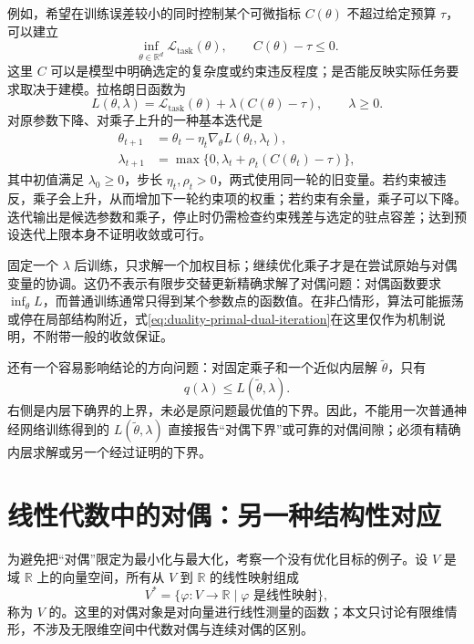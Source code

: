 \documentclass[UTF8]{ctexart}
\begin{document}
例如，希望在训练误差较小的同时控制某个可微指标 $C(\theta)$ 不超过给定预算 $\tau$，可以建立
\[
 \inf_{\theta\in\mathbb R^d}\mathcal L_{\mathrm{task}}(\theta),
 \qquad C(\theta)-\tau\leq0.
\]
这里 $C$ 可以是模型中明确选定的复杂度或约束违反程度；是否能反映实际任务要求取决于建模。拉格朗日函数为
\[
 L(\theta,\lambda)
 =\mathcal L_{\mathrm{task}}(\theta)+\lambda(C(\theta)-\tau),
 \qquad\lambda\geq0.
\]
对原参数下降、对乘子上升的一种基本迭代是
\begin{equation}
 \begin{aligned}
 \theta_{t+1}
 &=\theta_t-\eta_t\nabla_\theta L(\theta_t,\lambda_t),\\
 \lambda_{t+1}
 &=\max\{0,\lambda_t+\rho_t(C(\theta_t)-\tau)\},
 \end{aligned}
 \label{eq:duality-primal-dual-iteration}
\end{equation}
其中初值满足 $\lambda_0\geq0$，步长 $\eta_t,\rho_t>0$，两式使用同一轮的旧变量。若约束被违反，乘子会上升，从而增加下一轮约束项的权重；若约束有余量，乘子可以下降。迭代输出是候选参数和乘子，停止时仍需检查约束残差与选定的驻点容差；达到预设迭代上限本身不证明收敛或可行。

固定一个 $\lambda$ 后训练，只求解一个加权目标；继续优化乘子才是在尝试原始与对偶变量的协调。这仍不表示有限步交替更新精确求解了对偶问题：对偶函数要求 $\inf_\theta L$，而普通训练通常只得到某个参数点的函数值。在非凸情形，算法可能振荡或停在局部结构附近，式\eqref{eq:duality-primal-dual-iteration}在这里仅作为机制说明，不附带一般的收敛保证。

还有一个容易影响结论的方向问题：对固定乘子和一个近似内层解 $\widetilde\theta$，只有
\[
 q(\lambda)\leq L(\widetilde\theta,\lambda).
\]
右侧是内层下确界的上界，未必是原问题最优值的下界。因此，不能用一次普通神经网络训练得到的 $L(\widetilde\theta,\lambda)$ 直接报告“对偶下界”或可靠的对偶间隙；必须有精确内层求解或另一个经过证明的下界。

\section{线性代数中的对偶：另一种结构性对应}
\label{sec:duality-linear}

为避免把“对偶”限定为最小化与最大化，考察一个没有优化目标的例子。设 $V$ 是域 $\mathbb R$ 上的向量空间，所有从 $V$ 到 $\mathbb R$ 的线性映射组成
\[
 V^*=\{\varphi:V\to\mathbb R\mid\varphi\text{ 是线性映射}\},
\]
称为 $V$ 的。这里的对偶对象是对向量进行线性测量的函数；本文只讨论有限维情形，不涉及无限维空间中代数对偶与连续对偶的区别。
\end{document}
